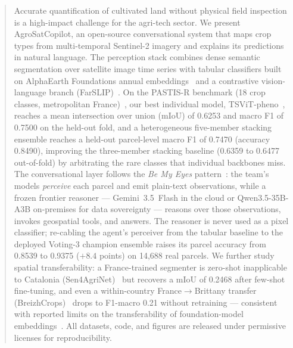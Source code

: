 \begin{abstract}
Accurate quantification of cultivated land without physical field
inspection is a high-impact challenge for the agri-tech sector.
We present AgroSatCopilot, an open-source conversational system that
maps crop types from multi-temporal Sentinel-2 imagery and explains its
predictions in natural language. The perception stack combines dense
semantic segmentation over satellite image time series with tabular
classifiers built on AlphaEarth Foundations annual
embeddings~\cite{brown2025alphaearth} and a contrastive
vision-language branch (FarSLIP)~\cite{li2025farslip}. On the PASTIS-R
benchmark (18 crop classes, metropolitan
France)~\cite{garnot2021pastis}, our best individual model,
TSViT-pheno~\cite{tarasiou2023tsvit}, reaches a mean intersection over
union (mIoU) of 0.6253 and macro F1 of 0.7500 on the held-out fold,
and a heterogeneous five-member stacking ensemble reaches a held-out
parcel-level macro F1 of 0.7470 (accuracy 0.8490), improving the
three-member stacking baseline (0.6359 to 0.6477 out-of-fold) by
arbitrating the rare classes that individual backbones miss.
The conversational layer follows the
\emph{Be My Eyes} pattern~\cite{huang2025bemyeyes}: the team's models
\emph{perceive} each parcel and emit plain-text observations, while a
frozen frontier reasoner --- Gemini~3.5~Flash in the cloud or
Qwen3.5-35B-A3B on-premises for data sovereignty --- reasons over those
observations, invokes geospatial tools, and answers. The reasoner is
never used as a pixel classifier; re-cabling the agent's perceiver from
the tabular baseline to the deployed Voting-3 champion ensemble raises its
parcel accuracy from 0.8539 to 0.9375 ($+8.4$ points) on 14{,}688 real
parcels. We further study spatial
transferability: a France-trained segmenter is zero-shot inapplicable
to Catalonia (Sen4AgriNet)~\cite{sykas2022sen4agrinet} but recovers a
mIoU of 0.2468 after few-shot fine-tuning, and even a within-country
France$\rightarrow$Brittany transfer (BreizhCrops)~\cite{russwurm2020breizhcrops}
drops to F1-macro 0.21 without retraining --- consistent with reported
limits on the transferability of foundation-model
embeddings~\cite{harvesting2026alphaearth}. All datasets, code, and
figures are released under permissive licenses for reproducibility.
\end{abstract}

